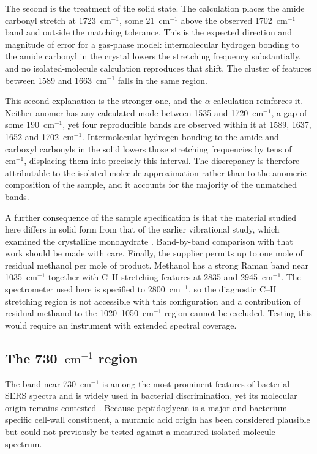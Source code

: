 \documentclass[preprint,12pt]{elsarticle}
\newcommand{\wn}{\ensuremath{\mathrm{cm}^{-1}}}
\begin{document}
The second is the treatment of the solid state. The calculation places the amide
carbonyl stretch at 1723~\wn{}, some 21~\wn{} above the observed 1702~\wn{}
band and outside the matching tolerance. This is the expected direction and
magnitude of error for a gas-phase model: intermolecular hydrogen bonding to the
amide carbonyl in the crystal lowers the stretching frequency substantially, and
no isolated-molecule calculation reproduces that shift. The cluster of features
between 1589 and 1663~\wn{} falls in the same region.

This second explanation is the stronger one, and the $\alpha$ calculation
reinforces it. Neither anomer has any calculated mode between 1535 and
1720~\wn{}, a gap of some 190~\wn{}, yet four reproducible bands are observed
within it at 1589, 1637, 1652 and 1702~\wn{}. Intermolecular hydrogen bonding to
the amide and carboxyl carbonyls in the solid lowers those stretching
frequencies by tens of \wn{}, displacing them into precisely this interval. The
discrepancy is therefore attributable to the isolated-molecule approximation
rather than to the anomeric composition of the sample, and it accounts for the
majority of the unmatched bands.

A further consequence of the sample specification is that the material studied
here differs in solid form from that of the earlier vibrational study, which
examined the crystalline monohydrate \cite{kouach1994}. Band-by-band comparison
with that work should be made with care. Finally, the supplier permits up to one
mole of residual methanol per mole of product. Methanol has a strong Raman band
near 1035~\wn{} together with C--H stretching features at 2835 and 2945~\wn{}.
The spectrometer used here is specified to 2800~\wn{}, so the diagnostic C--H
stretching region is not accessible with this configuration and a contribution
of residual methanol to the 1020--1050~\wn{} region cannot be excluded. Testing
this would require an instrument with extended spectral coverage.

\subsection{The 730~\wn{} region}

The band near 730~\wn{} is among the most prominent features of bacterial SERS
spectra and is widely used in bacterial discrimination, yet its molecular origin
remains contested \cite{premasiri2016origins, kubryk2016origin}. Because
peptidoglycan is a major and bacterium-specific cell-wall constituent, a muramic
acid origin has been considered plausible but could not previously be tested
against a measured isolated-molecule spectrum.
\end{document}
